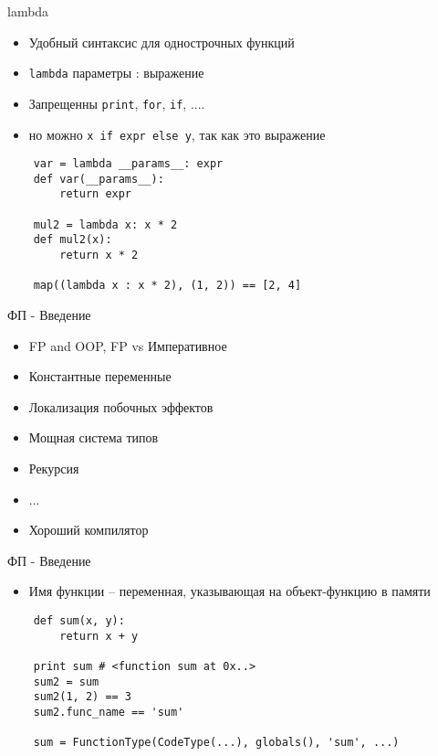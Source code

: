 \documentclass{article}
\begin{document}
\begin{center} lambda \end{center}
\begin{itemize}
    \item Удобный синтаксис для однострочных функций
    \item \lstinline!lambda! параметры : выражение
    \item Запрещенны \lstinline!print!, \lstinline!for!, \lstinline!if!, ....
    \item но можно \lstinline!x if expr else y!, так как это выражение
\end{itemize}
\vspace{15pt}
\begin{lstlisting}
    var = lambda __params__: expr
    def var(__params__):
        return expr

    mul2 = lambda x: x * 2
    def mul2(x):
        return x * 2

    map((lambda x : x * 2), (1, 2)) == [2, 4]
\end{lstlisting}
\newpage

\begin{center} ФП - Введение \end{center}
\begin{itemize}
    \item FP and OOP, FP vs Императивное
    \item Константные переменные
    \item Локализация побочных эффектов
    \item Мощная система типов
    \item Рекурсия
    \item ...
    \item Хороший компилятор
\end{itemize}
\newpage

\begin{center} ФП - Введение \end{center}
\begin{itemize}
    \item Имя функции – переменная, указывающая на объект-функцию в памяти
\end{itemize}
\vspace{15pt}
\begin{lstlisting}
    def sum(x, y):
        return x + y

    print sum # <function sum at 0x..>
    sum2 = sum
    sum2(1, 2) == 3
    sum2.func_name == 'sum'

    sum = FunctionType(CodeType(...), globals(), 'sum', ...)
\end{lstlisting}
\newpage
\end{document}
